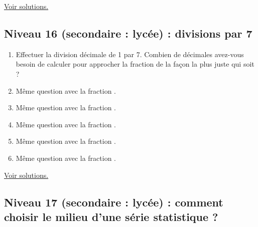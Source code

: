 \documentclass[11pt]{article}
\begin{document}
\hyperref[orgff0a054]{Voir solutions.}

\newpage


\subsection{Niveau 16 (secondaire : lycée) : divisions par 7}
\label{sec:org997e821}

\label{orge6e979c}


\begin{enumerate}
\item Effectuer la division décimale de 1 par 7. Combien de décimales
avez-vous besoin de calculer pour approcher la fraction
 de la façon la plus juste qui soit ?
\item Même question avec la fraction .
\item Même question avec la fraction .
\item Même question avec la fraction .
\item Même question avec la fraction .
\item Même question avec la fraction .
\end{enumerate}


\hyperref[org28f0f91]{Voir solutions.}

\newpage


\subsection{Niveau 17 (secondaire : lycée) : comment choisir le milieu d'une série statistique ?}
\label{sec:orgba249d0}

\label{org5141823}
\end{document}
